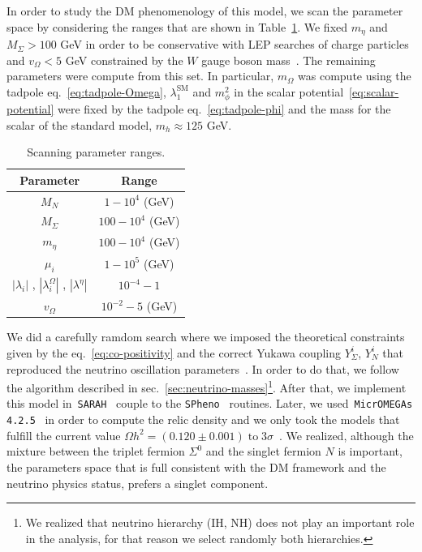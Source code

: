 \documentclass[12pt,letterpaper]{article}
\begin{document}
In order to study the DM phenomenology of this model, we scan the parameter space by considering the ranges that are shown in Table~\ref{tab:scan-parameter}. We fixed $m_{\eta}$ and $M_{\Sigma} > 100$ GeV in order to be conservative with LEP searches of charge particles~\cite{ALEPH:2005ab} and $v_{\Omega}<5$ GeV constrained by the $W$ gauge boson mass~\cite{Agashe:2014kda}. 
The remaining parameters were compute from this set. In particular, $m_{\Omega}$ was compute using the tadpole eq.~\ref{eq:tadpole-Omega}, $\lambda_1^{\text{SM}}$ and $m_{\phi}^2$ in the scalar potential~\ref{eq:scalar-potential} were fixed by the tadpole eq.~\ref{eq:tadpole-phi} and the mass for the scalar of the standard model, $m_{h}\approx 125$ GeV.
%
\begin{table}
\centering
\begin{tabular}{|c|c|}
\hline
Parameter & Range\\
\hline
$M_N$ &  $1-10^4$ (GeV) \\
$M_{\Sigma}$ &  $100-10^4$ (GeV) \\
$m_{\eta}$ &  $100-10^4$ (GeV) \\
$\mu_i$ & $1-10^{5}$ (GeV) \\
$|\lambda_i|$ , $|\lambda_i^{\Omega}|$ , $|\lambda^{\eta}|$ & $10^{-4} - 1$ \\
$v_{\Omega}$ & $10^{-2}- 5$  (GeV)\\
\hline
\end{tabular}
\caption{Scanning parameter ranges.}
\label{tab:scan-parameter}
\end{table}
%
We did  a carefully ramdom search where we imposed the theoretical constraints given by the eq.~\ref{eq:co-positivity} and the correct Yukawa coupling $Y_{\Sigma}^i$, $Y_N^i$ that reproduced the neutrino oscillation parameters~\cite{Forero:2014bxa, deSalas:2017kay}. In order to do that, we follow the algorithm described in sec.~\ref{sec:neutrino-masses}\footnote{We realized that neutrino hierarchy (IH, NH) does not play an important role in the analysis, for that reason we select randomly both hierarchies.}.
%
After that, we implement this model in~\texttt{SARAH}~\cite{Staub:2008uz,Staub:2009bi,Staub:2010jh,Staub:2012pb,Staub:2013tta} couple to the \texttt{SPheno}~\cite{Porod:2003um,Porod:2011nf} routines. 
Later, we used~\texttt{MicrOMEGAs 4.2.5}~\cite{Belanger:2006is} in order to compute the relic density and we only took the models that fulfill the current value $\Omega h^2 = (0.120 \pm 0.001)\; \text{to}\; 3\sigma$~\cite{Aghanim:2018eyx}.
We realized, although the mixture between the triplet fermion $\Sigma^0$ and the singlet fermion $N$ is important, the parameters space that is full consistent with the DM framework and the neutrino physics status, prefers a singlet component. 
\end{document}
